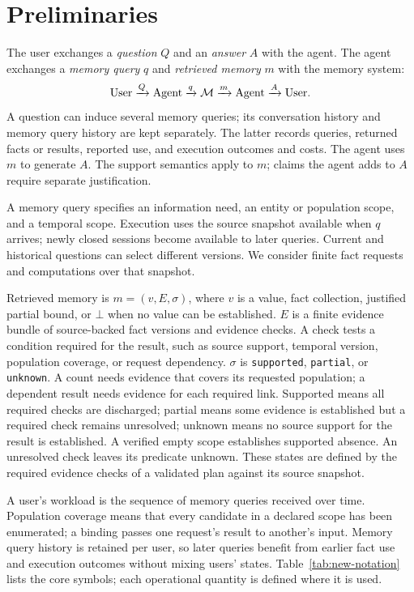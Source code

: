 \section{Preliminaries}
\label{sec:preliminary}

\label{subsec:new-interface}

The user exchanges a \emph{question} $Q$ and an \emph{answer} $A$ with
the agent. The agent exchanges a \emph{memory query} $q$ and
\emph{retrieved memory} $m$ with the memory system:
\begin{equation}
\label{eq:new-interface}
\mathrm{User}\xrightarrow{Q}\mathrm{Agent}
\xrightarrow{q}\mathcal{M}\xrightarrow{m}\mathrm{Agent}
\xrightarrow{A}\mathrm{User}.
\end{equation}
A question can induce several memory queries; its conversation history
and memory query history are kept separately. The latter records queries,
returned facts or results, reported use, and execution outcomes and costs.
The agent uses $m$ to generate $A$. The support semantics apply
to $m$; claims the agent adds to $A$ require separate justification.

A memory query specifies an information need, an entity or population
scope, and a temporal scope. Execution uses the source snapshot available
when $q$ arrives; newly closed sessions become available to later queries.
Current and historical questions can select different versions.
We consider finite fact requests and computations over that snapshot.

Retrieved memory is $m=(v,E,\sigma)$,
where $v$ is a value, fact collection, justified partial bound, or
$\bot$ when no value can be established.
$E$ is a finite evidence bundle of source-backed fact versions and
evidence checks. A check tests a condition required for the result, such
as source support, temporal version, population coverage, or request dependency.
$\sigma$ is
\texttt{supported}, \texttt{partial}, or \texttt{unknown}. A count needs
evidence that covers its requested population; a dependent result needs
evidence for each required link. Supported means all required checks
are discharged; partial means some evidence is established but a
required check remains unresolved; unknown means no source support for the result is established.
A verified empty scope establishes supported absence. An unresolved
check leaves its predicate unknown.
These states are defined by the required evidence checks of a validated
plan against its source snapshot.

A user's workload is the sequence of memory queries received over time.
Population coverage means that every candidate in a declared scope has
been enumerated; a binding passes one request's result to another's input.
Memory query history is retained per user, so later queries benefit from earlier
fact use and execution outcomes without mixing users' states.
Table~\ref{tab:new-notation} lists the core symbols; each operational
quantity is defined where it is used.

